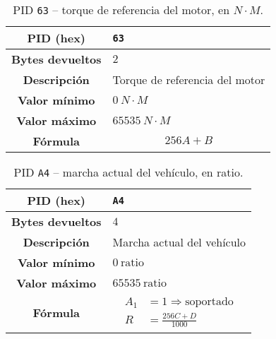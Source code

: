 \begin{table}[H]
  \centering
  \begin{tabularx}{\textwidth}{|c|X|}
    \hline
    \textbf{PID (hex)}       & \texttt{63}                    \\
    \hline
    \textbf{Bytes devueltos} & $2$                            \\
    \hline
    \textbf{Descripción}     & Torque de referencia del motor \\
    \hline
    \textbf{Valor mínimo}    & $0~N \cdot M$                  \\
    \hline
    \textbf{Valor máximo}    & $65535~N \cdot M$              \\
    \hline
    \textbf{Fórmula}         &                                %
    \begin{equation*}
      256A + B
    \end{equation*}                                \\
    \hline
  \end{tabularx}
  \caption{\ac{PID} \texttt{63} -- torque de referencia del motor, en $N \cdot M$.}
\end{table}

\begin{table}[H]
  \centering
  \begin{tabularx}{\textwidth}{|c|X|}
    \hline
    \textbf{PID (hex)}       & \texttt{A4}                \\
    \hline
    \textbf{Bytes devueltos} & $4$                        \\
    \hline
    \textbf{Descripción}     & Marcha actual del vehículo \\
    \hline
    \textbf{Valor mínimo}    & $0~\text{ratio}$           \\
    \hline
    \textbf{Valor máximo}    & $65535~\text{ratio}$       \\
    \hline
    \textbf{Fórmula}         &                            %
    \begin{equation*}
      \begin{aligned}
        A_1 & = 1 \Rightarrow \text{soportado} \\
        R   & = \frac{256C + D}{1000}
      \end{aligned}
    \end{equation*}                            \\
    \hline
  \end{tabularx}
  \caption{\ac{PID} \texttt{A4} -- marcha actual del vehículo, en ratio.}
\end{table}

